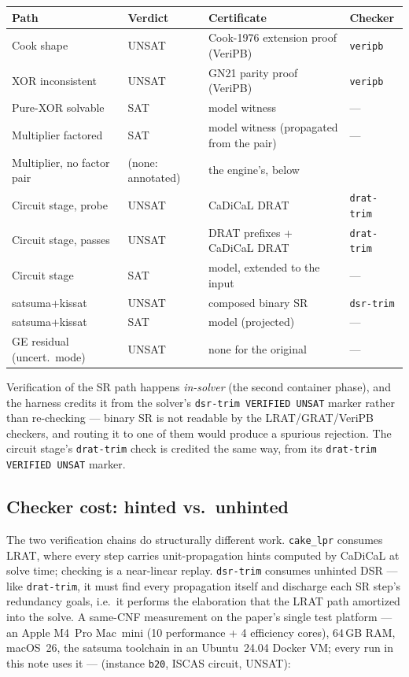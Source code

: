 \documentclass[10pt]{article}
\begin{document}
\begin{center}
\begin{tabular}{@{}llll@{}}
\toprule
Path & Verdict & Certificate & Checker \\
\midrule
Cook shape & UNSAT & Cook-1976 extension proof (VeriPB) & \texttt{veripb} \\
XOR inconsistent & UNSAT & GN21 parity proof (VeriPB) & \texttt{veripb} \\
Pure-XOR solvable & SAT & model witness & --- \\
Multiplier factored & SAT & model witness (propagated from the pair) & --- \\
Multiplier, no factor pair & (none: annotated) & the engine's, below & \\
Circuit stage, probe & UNSAT & CaDiCaL DRAT & \texttt{drat-trim} \\
Circuit stage, passes & UNSAT & DRAT prefixes + CaDiCaL DRAT & \texttt{drat-trim} \\
Circuit stage & SAT & model, extended to the input & --- \\
satsuma+kissat & UNSAT & composed binary SR & \texttt{dsr-trim} \\
satsuma+kissat & SAT & model (projected) & --- \\
GE residual (uncert.\ mode) & UNSAT & none for the original & --- \\
\bottomrule
\end{tabular}
\end{center}

Verification of the SR path happens \emph{in-solver} (the second
container phase), and the harness credits it from the solver's
\texttt{dsr-trim VERIFIED UNSAT} marker rather than re-checking ---
binary SR is not readable by the LRAT/GRAT/VeriPB checkers, and
routing it to one of them would produce a spurious rejection. The
circuit stage's \texttt{drat-trim} check is credited the same way,
from its \texttt{drat-trim VERIFIED UNSAT} marker.

\subsection{Checker cost: hinted vs.\ unhinted}
\label{sec:checkercost}

The two verification chains do structurally different work.
\texttt{cake\_lpr} consumes LRAT, where every step carries
unit-propagation hints computed by CaDiCaL at solve time; checking is
a near-linear replay. \texttt{dsr-trim} consumes unhinted DSR --- like
\texttt{drat-trim}, it must find every propagation itself and
discharge each SR step's redundancy goals, i.e.\ it performs the
elaboration that the LRAT path amortized into the solve. A same-CNF
measurement on the paper's single test platform --- an Apple M4~Pro
Mac~mini (10 performance + 4 efficiency cores), 64\,GB RAM, macOS~26,
the satsuma toolchain in an Ubuntu~24.04 Docker VM; every run in this
note uses it --- (instance \texttt{b20}, ISCAS circuit,
UNSAT):
\end{document}
